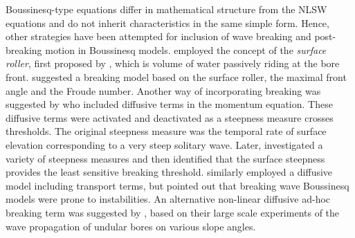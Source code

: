\documentclass[review]{elsarticle}
\begin{document}
 Boussinesq-type equations differ in mathematical structure from the NLSW equations and do not
inherit characteristics in the same simple form. Hence, other strategies have been attempted for inclusion of wave breaking and  
post-breaking motion in Boussinesq models. 
\citet{schaffer1993boussinesq} employed the concept of the {\em surface roller},
first proposed by \citet{Svendsen:1984}, 
which is volume of water passively riding at
the bore front. \citet{tissier2012new} suggested
a breaking  model based on the surface roller, the maximal front angle and the Froude number.
 Another way of incorporating breaking  was suggested by \cite{Kennedy2000} who included diffusive terms
in the momentum equation. These diffusive terms were  activated and deactivated as a steepness measure crosses thresholds. The original steepness measure was the temporal rate of surface elevation corresponding to a very steep solitary wave.
Later, \citet{lynett2006nearshore} investigated a variety of steepness measures and
then identified that the surface steepness provides 
the least sensitive breaking threshold. 
 \citet{Lovholt:2013a} similarly employed a diffusive model including transport terms, but pointed out that breaking wave Boussinesq models were prone to instabilities. 
An alternative non-linear diffusive ad-hoc breaking term was suggested by \citet{matsuyama2007study},
based on their large scale experiments of the wave propagation of undular bores on various slope angles. 
\end{document}
